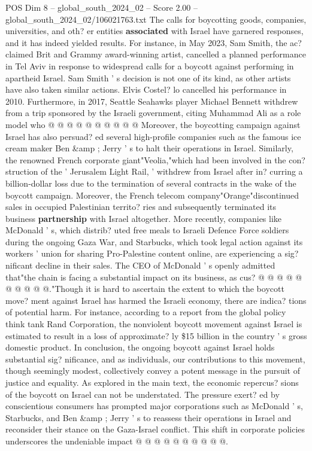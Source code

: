 \begin{textsample}{POS Dim 8 – global\_south\_2024\_02 – Score 2.00 – global\_south\_2024\_02/106021763.txt}
The calls for boycotting goods, companies, universities, and oth? er entities \textbf{associated} with Israel have garnered responses, and it has indeed yielded results.
For instance, in May 2023, Sam Smith, the ac? claimed Brit and Grammy award-winning artist, cancelled a planned performance in Tel Aviv in response to widespread calls for a boycott against performing in apartheid Israel.
Sam Smith ' s decision is not one of its kind, as other artists have also taken similar actions.
Elvis Costel? lo cancelled his performance in 2010.
Furthermore, in 2017, Seattle Seahawks player Michael Bennett withdrew from a trip sponsored by the Israeli government, citing Muhammad Ali as a role model who @ @ @ @ @ @ @ @ @ @ Moreover, the boycotting campaign against Israel has also persuad? ed several high-profile companies such as the famous ice cream maker Ben \&amp ; Jerry ' s to halt their operations in Israel.
Similarly, the renowned French corporate giant"Veolia,"which had been involved in the con? struction of the ' Jerusalem Light Rail, ' withdrew from Israel after in? curring a billion-dollar loss due to the termination of several contracts in the wake of the boycott campaign.
Moreover, the French telecom company"Orange"discontinued sales in occupied Palestinian territo? ries and subsequently terminated its business \textbf{partnership} with Israel altogether.
More recently, companies like McDonald ' s, which distrib? uted free meals to Israeli Defence Force soldiers during the ongoing Gaza War, and Starbucks, which took legal action against its workers ' union for sharing Pro-Palestine content online, are experiencing a sig? nificant decline in their sales.
The CEO of McDonald ' s openly admitted that"the chain is facing a substantial impact on its business, as cus? @ @ @ @ @ @ @ @ @ @."Though it is hard to ascertain the extent to which the boycott move? ment against Israel has harmed the Israeli economy, there are indica? tions of potential harm.
For instance, according to a report from the global policy think tank Rand Corporation, the nonviolent boycott movement against Israel is estimated to result in a loss of approximate? ly \$15 billion in the country ' s gross domestic product.
In conclusion, the ongoing boycott against Israel holds substantial sig? nificance, and as individuals, our contributions to this movement, though seemingly modest, collectively convey a potent message in the pursuit of justice and equality.
As explored in the main text, the economic repercus? sions of the boycott on Israel can not be understated.
The pressure exert? ed by conscientious consumers has prompted major corporations such as McDonald ' s, Starbucks, and Ben \&amp ; Jerry ' s to reassess their operations in Israel and reconsider their stance on the Gaza-Israel conflict.
This shift in corporate policies underscores the undeniable impact @ @ @ @ @ @ @ @ @ @.

\end{textsample}

